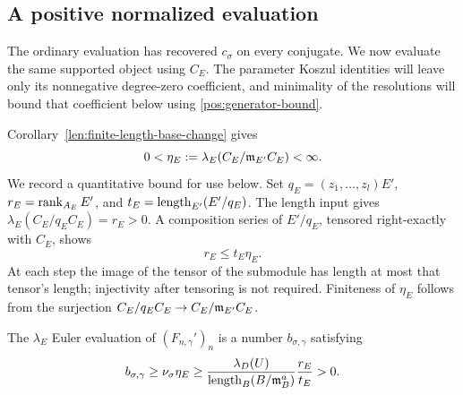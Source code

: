 \subsection{A positive normalized evaluation}

The ordinary evaluation has recovered $c_\sigma$ on every conjugate.
We now evaluate the same supported object using $C_E$.  The parameter
Koszul identities will leave only its nonnegative degree-zero
coefficient, and minimality of the resolutions will bound that
coefficient below using \eqref{pos:generator-bound}.

Corollary~\ref{len:finite-length-base-change} gives
\begin{equation}\label{pos:residue-positive}
 0<\eta_E:=\lambda_E(C_E/\mathfrak{m}_{E'}C_E)<\infty.
\end{equation}
We record a quantitative bound for use below.  Set
$q_E=(z_1,\ldots,z_l)E'$,
$r_E=\operatorname{rank}_{A_E}E'$, and
$t_E=\operatorname{length}_{E'}(E'/q_E)$.  The length input gives
$\lambda_E(C_E/q_EC_E)=r_E>0$.
A composition series of $E'/q_E$, tensored right-exactly with
$C_E$, shows
\begin{equation}\label{pos:residue-bound}
 r_E\le t_E\eta_E.
\end{equation}
At each step the image of the tensor of the submodule has
length at most that tensor's length; injectivity after tensoring
is not required.  Finiteness of $\eta_E$ follows from the
surjection $C_E/q_EC_E\to C_E/\mathfrak{m}_{E'}C_E$.

\begin{lemma}\label{pos:positive-evaluation}
The $\lambda_E$ Euler evaluation of $(F_{n,\gamma}')_n$ is a
number $b_{\sigma,\gamma}$ satisfying
\begin{equation}\label{pos:strict-bound}
 b_{\sigma,\gamma}
    \ge\nu_\sigma\eta_E
    \ge
       \frac{\lambda_D(U)}{\operatorname{length}_B(B/\mathfrak{m}_B^a)}
       \frac{r_E}{t_E}
    >0.
\end{equation}
\end{lemma}

